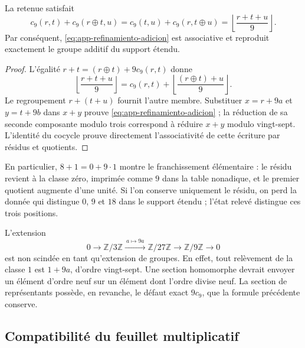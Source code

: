 \begin{proposition}
\label{prop:app-refinamiento-cociclo}
La retenue satisfait
\begin{equation}
 c_9(r,t)+c_9(r\oplus t,u)
 =c_9(t,u)+c_9(r,t\oplus u)
 =\left\lfloor\frac{r+t+u}{9}\right\rfloor.
 \label{eq:app-refinamiento-cociclo}
\end{equation}
Par conséquent, \eqref{eq:app-refinamiento-adicion} est associative et
reproduit exactement le groupe additif du support étendu.
\end{proposition}
\begin{proof}
L'égalité $r+t=(r\oplus t)+9c_9(r,t)$ donne
\[
 \left\lfloor\frac{r+t+u}{9}\right\rfloor
 =c_9(r,t)+\left\lfloor\frac{(r\oplus t)+u}{9}\right\rfloor.
\]
Le regroupement $r+(t+u)$ fournit l'autre membre. Substituer
$x=r+9a$ et $y=t+9b$ dans $x+y$ prouve
\eqref{eq:app-refinamiento-adicion} ; la réduction de sa seconde
composante modulo trois correspond à réduire $x+y$ modulo vingt-sept.
L'identité du cocycle prouve directement l'associativité de cette
écriture par résidus et quotients.
\end{proof}

En particulier, $8+1=0+9\cdot1$ montre le franchissement élémentaire : le résidu
revient à la classe zéro, imprimée comme $9$ dans la table nonadique, et le
premier quotient augmente d'une unité. Si l'on conserve uniquement le
résidu, on perd la donnée qui distingue $0$, $9$ et $18$ dans le support
étendu ; l'état relevé distingue ces trois positions.

L'extension
\[
 0\longrightarrow\mathbb Z/3\mathbb Z
 \xrightarrow{\ a\mapsto9a\ }
 \mathbb Z/27\mathbb Z
 \longrightarrow\mathbb Z/9\mathbb Z\longrightarrow0
\]
est non scindée en tant qu'extension de groupes. En effet, tout
relèvement de la classe $1$ est $1+9a$, d'ordre vingt-sept. Une
section homomorphe devrait envoyer un élément d'ordre neuf sur un élément
dont l'ordre divise neuf. La section de représentants possède, en
revanche, le défaut exact $9c_9$, que la formule précédente conserve.

\subsection{Compatibilité du feuillet multiplicatif}

